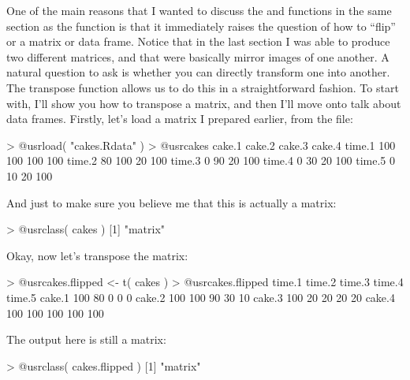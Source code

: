 One of the main reasons that I wanted to discuss the  and  functions in the same section as the  function is that it immediately raises the question of how to ``flip'' or  a matrix or data frame. Notice that in the last section I was able to produce two different matrices,  and  that were basically mirror images of one another. A natural question to ask is whether you can directly transform one into another. The transpose function  allows us to do this in a straightforward fashion. To start with, I'll show you how to transpose a matrix, and then I'll move onto talk about data frames. Firstly, let's load a matrix I prepared earlier, from the  file:
\begin{rblock1}
> @usr{load( "cakes.Rdata" )}
> @usr{cakes}
       cake.1 cake.2 cake.3 cake.4
time.1    100    100    100    100
time.2     80    100     20    100
time.3      0     90     20    100
time.4      0     30     20    100
time.5      0     10     20    100
\end{rblock1}
And just to make sure you believe me that this is actually a matrix:
\begin{rblock1}
> @usr{class( cakes )}
[1] "matrix"
\end{rblock1}
Okay, now let's transpose the matrix:
\begin{rblock1}
> @usr{cakes.flipped <- t( cakes )}
> @usr{cakes.flipped}
       time.1 time.2 time.3 time.4 time.5
cake.1    100     80      0      0      0
cake.2    100    100     90     30     10
cake.3    100     20     20     20     20
cake.4    100    100    100    100    100
\end{rblock1}
The output here is still a matrix:
\begin{rblock1}
> @usr{class( cakes.flipped )}
[1] "matrix"
\end{rblock1}

